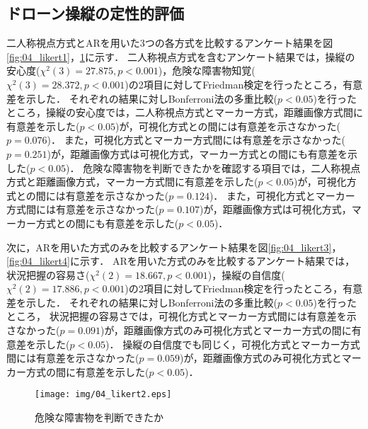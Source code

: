 \documentclass[submit]{ipsj}
\begin{document}
\subsection{ドローン操縦の定性的評価}
\label{result_2}
二人称視点方式とARを用いた3つの各方式を比較するアンケート結果を図\ref{fig:04_likert1}，\ref{fig:04_likert2}に示す．
二人称視点方式を含むアンケート結果では，操縦の安心度($\chi^{2}(3)=27.875, p < 0.001$)，危険な障害物知覚($\chi^{2}(3)=28.372, p < 0.001$)の2項目に対してFriedman検定を行ったところ，有意差を示した．
それぞれの結果に対しBonferroni法の多重比較($p < 0.05$)を行ったところ，操縦の安心度では，二人称視点方式とマーカー方式，距離画像方式間に有意差を示した($p < 0.05$)が，可視化方式との間には有意差を示さなかった($p = 0.076$)．
また，可視化方式とマーカー方式間には有意差を示さなかった($p = 0.251$)が，距離画像方式は可視化方式，マーカー方式との間にも有意差を示した($p < 0.05$)．
危険な障害物を判断できたかを確認する項目では，二人称視点方式と距離画像方式，マーカー方式間に有意差を示した($p < 0.05$)が，可視化方式との間には有意差を示さなかった($p = 0.124$)．
また，可視化方式とマーカー方式間には有意差を示さなかった($p = 0.107$)が，距離画像方式は可視化方式，マーカー方式との間にも有意差を示した($p < 0.05$)．
\par
次に，ARを用いた方式のみを比較するアンケート結果を図\ref{fig:04_likert3}，\ref{fig:04_likert4}に示す．
ARを用いた方式のみを比較するアンケート結果では，状況把握の容易さ($\chi^{2}(2)=18.667, p < 0.001$)，操縦の自信度($\chi^{2}(2)=17.886, p < 0.001$)の2項目に対してFriedman検定を行ったところ，有意差を示した．
それぞれの結果に対しBonferroni法の多重比較($p < 0.05$)を行ったところ，
状況把握の容易さでは，可視化方式とマーカー方式間には有意差を示さなかった($p = 0.091$)が，距離画像方式のみ可視化方式とマーカー方式の間に有意差を示した($p < 0.05$)．
操縦の自信度でも同じく，可視化方式とマーカー方式間には有意差を示さなかった($p = 0.059$)が，距離画像方式のみ可視化方式とマーカー方式の間に有意差を示した($p < 0.05$)．


\begin{figure}[tb]
\centering
\texttt{[image: img/04\_likert2.eps]}
\caption{危険な障害物を判断できたか}
\label{fig:04_likert2}
\end{figure}




\end{document}
